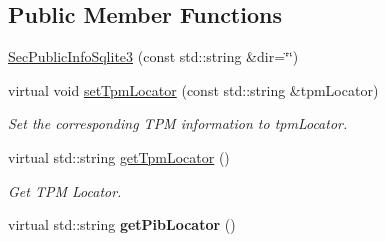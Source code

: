 \subsection*{Public Member Functions}
\begin{DoxyCompactItemize}
\item 
\hyperlink{classndn_1_1SecPublicInfoSqlite3_a55544ffecf1ee7fc4a95d20f469f151f}{Sec\+Public\+Info\+Sqlite3} (const std\+::string \&dir=\char`\"{}\char`\"{})
\item 
virtual void \hyperlink{classndn_1_1SecPublicInfoSqlite3_afceb7f9467295a9fa2560040cea51a1c}{set\+Tpm\+Locator} (const std\+::string \&tpm\+Locator)
\begin{DoxyCompactList}\small\item\em Set the corresponding T\+PM information to {\ttfamily tpm\+Locator}. \end{DoxyCompactList}\item 
virtual std\+::string \hyperlink{classndn_1_1SecPublicInfoSqlite3_adeb2a14608a898450726a56be5aafa77}{get\+Tpm\+Locator} ()
\begin{DoxyCompactList}\small\item\em Get T\+PM Locator. \end{DoxyCompactList}\item 
virtual std\+::string {\bfseries get\+Pib\+Locator} ()\hypertarget{classndn_1_1SecPublicInfoSqlite3_a1186392ada2dd31145bdb8ebdb106f1d}{}\label{classndn_1_1SecPublicInfoSqlite3_a1186392ada2dd31145bdb8ebdb106f1d}


\end{DoxyCompactItemize}
